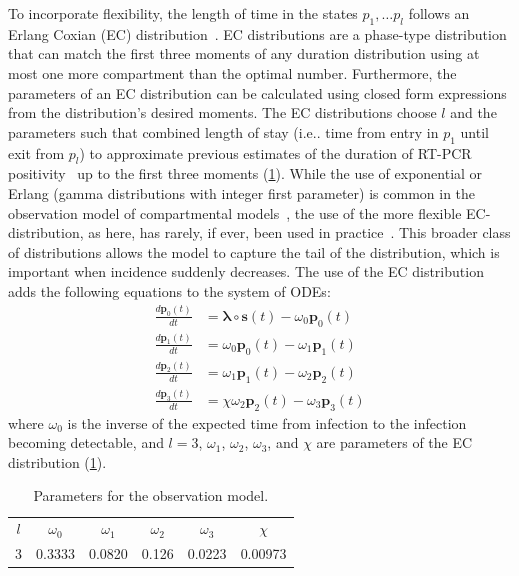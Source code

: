 \documentclass[9pt,twocolumn,twoside]{pnas-new}
\makeatletter
\renewcommand{\vec}[1]{\bm{#1}}
\DeclareRobustCommand\onedot{\futurelet\@let@token\@onedot}
\def\@onedot{\ifx\@let@token.\else.\null\fi\xspace}
\def\ie{i.e\onedot} \def\Ie{{I.e}\onedot}
\makeatother
\begin{document}
To incorporate flexibility, the length of time in the states $p_1, \dots p_l$ follows an Erlang Coxian (EC) distribution~\citep{osogamiClosed}.
EC distributions are a phase-type distribution that can match the first three moments of any duration distribution using at most one more compartment than the optimal number.
Furthermore, the parameters of an EC distribution can be calculated using closed form expressions from the distribution's desired moments.
The EC distributions  choose $l$ and the parameters such that combined length of stay (\ie time from entry in $p_1$ until exit from $p_l$) to approximate previous estimates of the duration of RT-PCR positivity~\citep{blakeDuration} up to the first three moments (\cref{SEIR:table:ec-params}).
While the use of exponential or Erlang (gamma distributions with integer first parameter) is common in the observation model of compartmental models~\citep[e.g.][]{overtonEpiBeds}, the use of the more flexible EC-distribution, as here, has rarely, if ever, been used in practice~\citep{hurtadoGLCT}.
This broader class of distributions allows the model to capture the tail of the distribution, which is important when incidence suddenly decreases.
The use of the EC distribution adds the following equations to the system of ODEs:
\begin{align}
    \frac{d\vec{p}_0(t)}{dt} &= \vec{\lambda} \circ \vec{s}(t) - \omega_0 \vec{p}_0(t) \\
    \frac{d\vec{p}_1(t)}{dt} &= \omega_0 \vec{p}_0(t) - \omega_1 \vec{p}_1(t) \\
    \frac{d\vec{p}_2(t)}{dt} &= \omega_1 \vec{p}_1(t) - \omega_{2} \vec{p}_2(t) \\
    \frac{d\vec{p}_3(t)}{dt} &= \chi \omega_{2} \vec{p}_2(t) - \omega_{3} \vec{p}_3(t)
\end{align}
where $\omega_0$ is the inverse of the expected time from infection to the infection becoming detectable, and $l = 3$, $\omega_1$, $\omega_2$, $\omega_3$, and $\chi$ are parameters of the EC distribution (\cref{SEIR:table:ec-params}).
\begin{table}
    \centering
    \begin{tabular}{c c c c c c}
        $l$ & $\omega_0$ & $\omega_{1}$ &$\omega_{2}$ & $\omega_{3}$ & $\chi$ \\
        3 & 0.3333 & 0.0820 & 0.126 & 0.0223 & 0.00973  \\
    \end{tabular}
    \caption{Parameters for the observation model.}
    \label{SEIR:table:ec-params}
\end{table}
\end{document}
